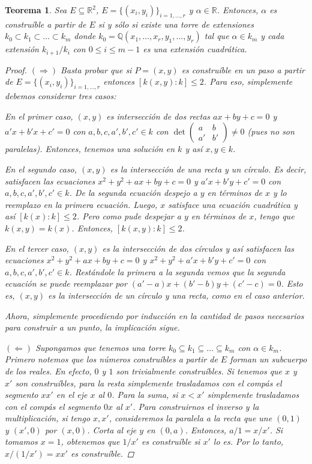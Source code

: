 \documentclass[12pt]{book}
\newtheorem{teo}{Teorema}[section]
\theoremstyle{definition}
\newcommand{\RR}{\mathbb{R}}      %
\newcommand{\QQ}{\mathbb{Q}}
\begin{document}
\begin{teo}
Sea $E\subseteq\RR^2$, $E=\{(x_i,y_i)\}_{i=1,\ldots, r}$ y $\alpha\in\RR$. Entonces, $\alpha$ es construíble a partir de $E$ si y sólo si existe una torre de extensiones $k_0 \subset k_1\subset\ldots\subset k_m$ donde $k_0=\QQ(x_1,\ldots , x_r,y_1,\ldots , y_r)$ tal que $\alpha\in k_m$ y cada extensión $k_{i+1}/k_i$ con $0\leq i\leq m-1$ es una extensión cuadrática.
\begin{proof}
$(\Longrightarrow)$ Basta probar que si $P=(x,y)$ es construíble en un paso a partir de $E=\{(x_i,y_i)\}_{i=1,\ldots, r}$ entonces $[k(x,y):k]\leq 2$. Para eso, simplemente debemos considerar tres casos:

En el primer caso, $(x,y)$ es intersección de dos rectas $ax+by+c=0$ y $a'x+b'x+c'=0$ con $a,b,c,a',b',c'\in k$ con $\det \begin{pmatrix}a & b\\ a' & b'\end{pmatrix} \neq 0$ (pues no son paralelas). Entonces, tenemos una solución en $k$ y así $x,y\in k$.

En el segundo caso, $(x,y)$ es la intersección de una recta y un círculo. Es decir, satisfacen las ecuaciones $x^2 +y^2 + ax+by+c=0$ y $a'x+b'y+c'=0$ con $a,b,c,a',b',c'\in k$. De la segunda ecuación despejo a $y$ en términos de $x$ y lo reemplazo en la primera ecuación. Luego, $x$ satisface una ecuación cuadrática y así $[k(x):k]\leq 2$. Pero como pude despejar a $y$ en términos de $x$, tengo que $k(x,y)=k(x)$. Entonces, $[k(x,y):k]\leq 2$.

En el tercer caso, $(x,y)$ es la intersección de dos círculos y así satisfacen las ecuaciones $x^2+ y^2 + ax+by+c=0$ y $x^2 + y^2 + a'x + b'y+ c'=0$ con $a,b,c,a',b',c'\in k$. Restándole la primera a la segunda vemos que la segunda ecuación se puede reemplazar por $(a'-a)x + (b'-b)y + (c'-c)=0$. Esto es, $(x,y)$ es la intersección de un círculo y una recta, como en el caso anterior.

Ahora, simplemente procediendo por inducción en la cantidad de pasos necesarios para construir a un punto, la implicación sigue.

$(\Longleftarrow)$ Supongamos que tenemos una torre $k_0\subseteq k_1\subseteq\ldots\subseteq k_m$ con $\alpha\in k_m$. Primero notemos que los números construíbles a partir de $E$ forman un subcuerpo de los reales. En efecto, $0$ y $1$ son trivialmente construíbles. Si tenemos que $x$ y $x'$ son construíbles, para la resta simplemente trasladamos con el compás el segmento $xx'$ en el eje $x$ al $0$. Para la suma, si $x<x'$ simplemente trasladamos con el compás el segmento $0x$ al $x'$. Para construirnos el inverso y la multiplicación, si tengo $x,x'$, consideremos la paralela a la recta que une $(0,1)$ y $(x',0)$ por $(x,0)$. Corta al eje $y$ en $(0,a)$. Entonces, $a/1 = x/x'$. Si tomamos $x=1$, obtenemos que $1/x'$ es construíble si $x'$ lo es. Por lo tanto, $x/(1/x') = xx'$ es construíble.


\end{proof}
\end{teo}
\end{document}
